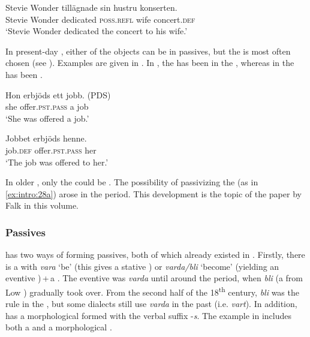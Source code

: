 \documentclass[output=paper]{langscibook}
\begin{document}
\ex
\gll  Stevie Wonder   tillägnade   sin       hustru   konserten.\\
        Stevie Wonder  dedicated  \textsc{poss.refl}  wife     concert\textsc{.def}  \\
\glt        ‘Stevie Wonder dedicated the concert to his wife.’ \citep[137]{Lundquist2014Double}
\z
\z

In present-day , either of the objects can be  in passives, but the  is most often chosen (see \citealt{Lundquist2004}). Examples are given in . In , the  has been  in the , whereas in  the  has been .


\ea\label{ex:intro:28}
\ea\label{ex:intro:28a}
\gll  Hon   erbjöds         ett jobb. (PDS)\\
she   offer\textsc{.pst.pass}   a    job\\
\glt ‘She was offered a job.’

\ex\label{ex:intro:28b}
\gll  Jobbet   erbjöds         henne. \\
  job.\textsc{def}     offer.\textsc{pst.pass} her\\
    \glt `The job was offered to her.’
\z
\z



In older , only the  could be . The possibility of passivizing the  (as in \ref{ex:intro:28a}) arose in the  period. This development is the topic of the paper by Falk in this volume.


\subsubsection{Passives}\label{sec:intro:3.3.2}


 has two ways of forming passives, both of which already existed in . Firstly, there is a  with \textit{vara} ‘be’ (this gives a stative ) or \textit{varda/bli} ‘become’ (yielding an eventive )\,+\,a  . The eventive   was \textit{varda} until around the  period, when \textit{bli} (a  from Low ) gradually took over. From the second half of the 18\textsuperscript{th} century, \textit{bli} was the rule in the , but some dialects still use \textit{varda} in the past  (i.e. \textit{vart}). In addition,  has a morphological  formed with the verbal suffix -\textit{s}. The example in  includes both a  and a morphological .
\end{document}

